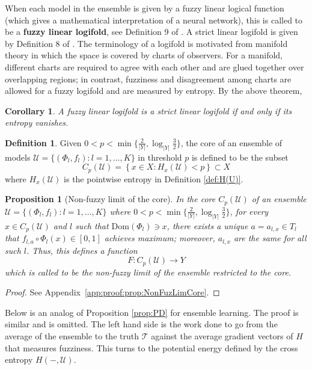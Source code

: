 \documentclass{article}
\theoremstyle{plain}
\newtheorem{proposition}[theorem]{Proposition}
\newtheorem{corollary}[theorem]{Corollary}
\theoremstyle{definition}
\newtheorem{definition}[theorem]{Definition}
\theoremstyle{remark}
\newcommand{\cT}{\mathcal{T}}
\newcommand{\cU}{\mathcal{U}}
\newcommand{\Dom}{\mathrm{Dom}}
\begin{document}
When each model in the ensemble is given by a fuzzy linear logical function (which gives a mathematical interpretation of a neural network), this is called to be a \textbf{fuzzy linear logifold}, see Definition 9 of \cite{Jung-Lau}. A strict linear logifold is given by Definition 8 of \cite{Jung-Lau}. The terminology of a logifold is motivated from manifold theory in which the space is covered by charts of observers. 
For a manifold, different charts are required to agree with each other and are glued together over overlapping regions; in contrast, fuzziness and disagreement among charts are allowed for a fuzzy logifold and are measured by entropy.
By the above theorem,
\begin{corollary}
	A fuzzy linear logifold is a strict linear logifold if and only if its entropy vanishes.
\end{corollary}

\begin{definition} \label{def:core}
Given $0 < p < \min\{\frac{2}{|Y|}, \log_{|Y|} \frac{3}{2}\}$, the core of an ensemble of models $\cU = \{(\Phi_l,f_l): l=1,\ldots,K\}$ in threshold $p$ is defined to be the subset
$$ C_p(\cU) = \left\{x \in X: H_x(\cU) < p \right\} \subset X $$
where $H_x(\cU)$ is the pointwise entropy in Definition \ref{def:H(U)}.
\end{definition}

\begin{proposition}[Non-fuzzy limit of the core]\label{prop:NonFuzLimCore}
	In the core $C_p(\cU)$ of an ensemble $\cU = \{(\Phi_l,f_l): l=1,\ldots,K\}$ where $0 < p < \min\{\frac{2}{|Y|}, \log_{|Y|} \frac{3}{2}\}$, for every $x\in C_p(\cU)$ and $l$ such that $\Dom(\Phi_l) \ni x$, there exists a unique $a=a_{l,x} \in T_l$ that $f_{l,a}\circ\Phi_l(x)\in [0,1]$ achieves maximum; moreover, $a_{l,x}$ are the same for all such $l$. Thus, this defines a function 
	$$F: C_p(\cU) \to Y$$ 
	which is called to be the non-fuzzy limit of the ensemble restricted to the core.
\end{proposition}

\begin{proof}
	See Appendix~\ref{app:proof:prop:NonFuzLimCore}.
\end{proof}

Below is an analog of Proposition \ref{prop:PD} for ensemble learning. The proof is similar and is omitted. The left hand side is the work done to go from the average of the ensemble to the truth $\cT$ against the average gradient vectors of $H$ that measures fuzziness. This turns to the potential energy defined by the cross entropy $H(-,\cU)$. 
\end{document}

